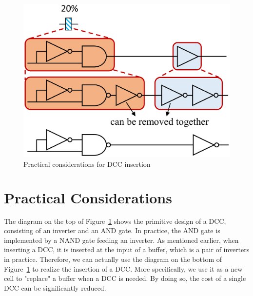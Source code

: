 \begin{figure}
    \centering
    \includegraphics[width=0.7\columnwidth]{images/DCC_reduction.png} %
    \caption{Practical considerations for DCC insertion}
    \label{fig:dccreduc}
\end{figure}

\section{Practical Considerations}
\label{subsec:tpc}
The diagram on the top of Figure~\ref{fig:dccreduc} shows the primitive design of a DCC, consisting of an inverter and an AND gate. In practice, the AND gate is implemented by a NAND gate feeding an inverter. As mentioned earlier, when inserting a DCC, it is inserted at the input of a buffer, which is a pair of inverters in practice. Therefore, we can actually use the diagram on the bottom of Figure~\ref{fig:dccreduc} to realize the insertion of a DCC. More specifically, we use it as a new cell to "replace" a buffer when a DCC is needed. By doing so, the cost of a single DCC can be significantly reduced.%
